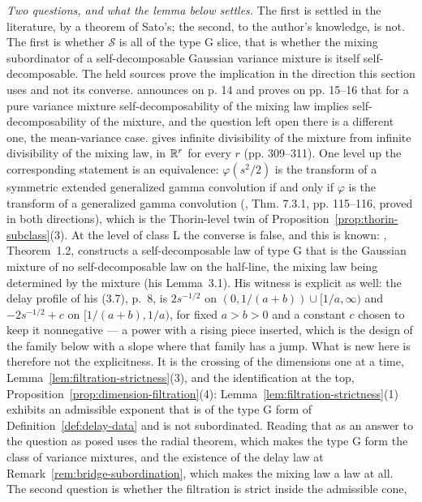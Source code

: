 \begin{remark}
\emph{Two questions, and what the lemma below settles.} The first is settled in the literature, by a theorem of Sato's; the second, to the author's knowledge, is not. The first is whether $\mathcal{S}$ is all of the type G slice, that is whether the
mixing subordinator of a self-decomposable Gaussian variance mixture is itself
self-decomposable. The held sources prove the implication in the direction this section uses
and not its converse.  announces on p. 14 and proves on pp. 15--16
that for a pure variance mixture self-decomposability of the mixing law implies
self-decomposability of the mixture, and the question left open there is a different one, the
mean-variance case.  gives infinite divisibility of the
mixture from infinite divisibility of the mixing law, in $\mathbb{R}^r$ for every $r$ (pp. 309--311).
One level up the corresponding statement is an equivalence: $\varphi(s^2/2)$ is the transform
of a symmetric extended generalized gamma convolution if and only if $\varphi$ is the transform
of a generalized gamma convolution (, Thm. 7.3.1, pp. 115--116,
proved in both directions), which is the Thorin-level twin of Proposition~\ref{prop:thorin-subclass}(3). At the level of class L the converse is false, and this is known: , Theorem~1.2, constructs a self-decomposable law of type G that is the Gaussian mixture of no self-decomposable law on the half-line, the mixing law being determined by the mixture (his Lemma~3.1). His witness is explicit as well: the delay profile of his (3.7), p.~8, is
$2s^{-1/2}$ on $(0,1/(a+b)) \cup [1/a,\infty)$ and $-2s^{-1/2} + c$ on $[1/(a+b),1/a)$, for fixed
$a > b > 0$ and a constant $c$ chosen to keep it nonnegative --- a power with a rising piece
inserted, which is the design of the family below with a slope where that family has a jump. What
is new here is therefore not the explicitness. It is the crossing of the dimensions one at a time,
Lemma~\ref{lem:filtration-strictness}(3), and the identification at the top,
Proposition~\ref{prop:dimension-filtration}(4):
Lemma~\ref{lem:filtration-strictness}(1) exhibits an admissible exponent that is of the type G form of
Definition~\ref{def:delay-data} and is not subordinated. Reading that as an answer to the question as
posed uses the radial theorem, which makes the type G form the class of variance mixtures, and
the existence of the delay law at Remark~\ref{rem:bridge-subordination}, which makes the mixing law a
law at all. The second question is whether the filtration is strict inside the admissible cone,

\end{remark}
